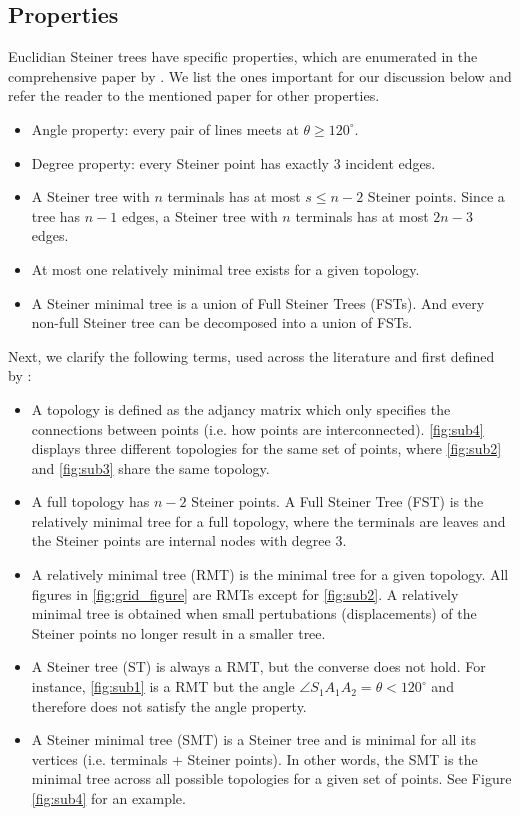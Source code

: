 \documentclass{l4proj}
\begin{document}
\subsection{Properties}
\label{sec:esmt_properties}
Euclidian Steiner trees have specific properties, which are enumerated in the comprehensive paper by \cite{Gilbert1968SteinerMT}. We list the ones important for our discussion below and refer the reader to the mentioned paper for other properties.
\begin{itemize}
    \item Angle property: every pair of lines meets at $\theta \geq 120^\circ$.
    \item Degree property: every Steiner point has exactly 3 incident edges.
    \item A Steiner tree with $n$ terminals has at most $s \leq n - 2$ Steiner points. Since a tree has $n - 1$ edges, a Steiner tree with $n$ terminals has at most $2n - 3$ edges.
    \item At most one relatively minimal tree exists for a given topology.
    \item A Steiner minimal tree is a union of Full Steiner Trees (FSTs). And every non-full Steiner tree can be decomposed into a union of FSTs.
\end{itemize}

Next, we clarify the following terms, used across the literature and first defined by \cite{Gilbert1968SteinerMT}:
\begin{itemize}
    \item A topology is defined as the adjancy matrix which only specifies the connections between points (i.e. how points are interconnected). \ref{fig:sub4} displays three different topologies for the same set of points, where \ref{fig:sub2} and \ref{fig:sub3} share the same topology.
    \item A full topology has $n - 2$ Steiner points. A Full Steiner Tree (FST) is the relatively minimal tree for a full topology, where the terminals are leaves and the Steiner points are internal nodes with degree 3.
    \item A relatively minimal tree (RMT) is the minimal tree for a given topology. All figures in \ref{fig:grid_figure} are RMTs except for \ref{fig:sub2}. A relatively minimal tree is obtained when small pertubations (displacements) of the Steiner points no longer result in a smaller tree.
    \item  A Steiner tree (ST) is always a RMT, but the converse does not hold. For instance, \ref{fig:sub1} is a RMT but the angle $\angle S_1A_1A_2 = \theta < 120^\circ$ and therefore does not satisfy the angle property.
    \item A Steiner minimal tree (SMT) is a Steiner tree and is minimal for all its vertices (i.e. terminals + Steiner points). In other words, the SMT is the minimal tree across all possible topologies for a given set of points. See Figure \ref{fig:sub4} for an example.
\end{itemize}
\end{document}
